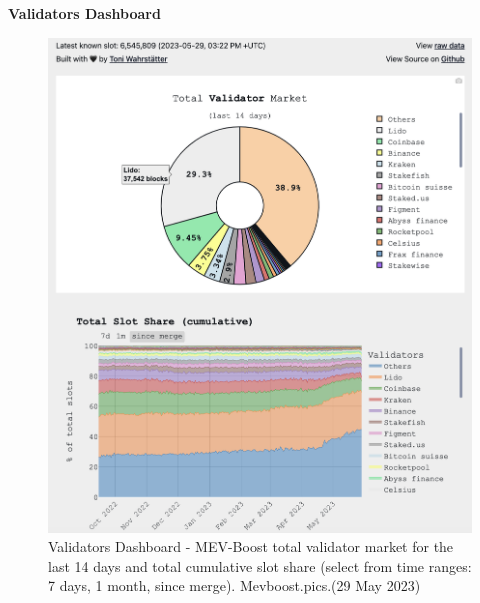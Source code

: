 \documentclass[UTF8]{article}
\begin{document}
\clearpage
\textbf{Validators Dashboard} \\
\begin{figure}[htbp]
\begin{center}
\includegraphics[width=0.85\linewidth]{images/mevvalidator1}
\caption{Validators Dashboard - MEV-Boost total validator market for the last 14 days  and total cumulative slot share (select from time ranges: 7 days, 1 month, since merge). Mevboost.pics.(29 May 2023)}
\label{fig:mevvalidator1}
\end{center}
\end{figure}
\end{document}
